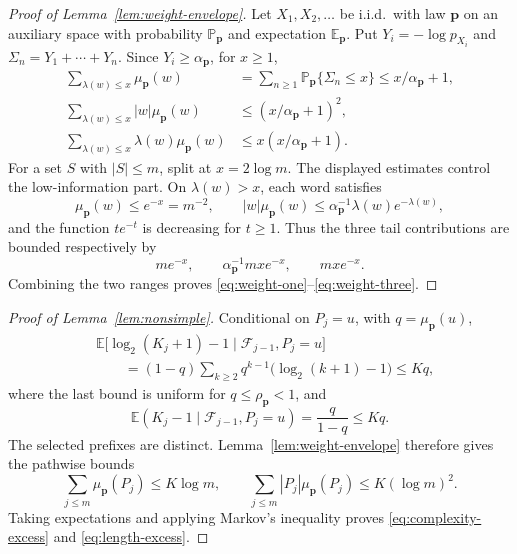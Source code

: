 \documentclass[journal]{IEEEtran}
\theoremstyle{plain}
\theoremstyle{definition}
\theoremstyle{remark}
\newcommand{\F}{\mathcal F}
\newcommand{\Paux}{\mathbb P_{\mathbf p}}
\newcommand{\Eaux}{\mathbb E_{\mathbf p}}
\newcommand{\muP}{\mu_{\mathbf p}}
\newcommand{\rhoP}{\rho_{\mathbf p}}
\newcommand{\alphaP}{\alpha_{\mathbf p}}
\begin{document}
\begin{proof}[Proof of Lemma~\ref{lem:weight-envelope}]
Let $X_1,X_2,\ldots$ be i.i.d.\ with law $\mathbf p$ on an auxiliary space with probability $\Paux$ and expectation $\Eaux$.  Put $Y_i=-\log p_{X_i}$ and $\Sigma_n=Y_1+\cdots+Y_n$.  Since $Y_i\ge\alphaP$, for $x\ge1$,
\begin{align*}
 \sum_{\lambda(w)\le x}\muP(w)
 &=\sum_{n\ge1}\Paux\{\Sigma_n\le x\}
 \le x/\alphaP+1,\\
 \sum_{\lambda(w)\le x}|w|\muP(w)
 &\le (x/\alphaP+1)^2,\\
 \sum_{\lambda(w)\le x}\lambda(w)\muP(w)
 &\le x(x/\alphaP+1).
\end{align*}
For a set $S$ with $|S|\le m$, split at $x=2\log m$.  The displayed estimates control the low-information part.  On $\lambda(w)>x$, each word satisfies
\begin{equation*}
 \muP(w)\le e^{-x}=m^{-2},
 \qquad
 |w|\muP(w)\le\alphaP^{-1}\lambda(w)e^{-\lambda(w)},
\end{equation*}
and the function $t e^{-t}$ is decreasing for $t\ge1$.  Thus the three tail contributions are bounded respectively by
\begin{equation*}
 m e^{-x},
 \qquad
 \alphaP^{-1}mxe^{-x},
 \qquad
 mxe^{-x}.
\end{equation*}
Combining the two ranges proves \eqref{eq:weight-one}--\eqref{eq:weight-three}.
\end{proof}

\begin{proof}[Proof of Lemma~\ref{lem:nonsimple}]
Conditional on $P_j=u$, with $q=\muP(u)$,
\begin{align*}
 &\mathbb E\bigl[\log_2(K_j+1)-1\mid\F_{j-1},P_j=u\bigr]\\
 &\qquad=(1-q)\sum_{k\ge2}q^{k-1}
       \bigl(\log_2(k+1)-1\bigr)
 \le Kq,
\end{align*}
where the last bound is uniform for $q\le\rhoP<1$, and
\begin{equation*}
 \mathbb E(K_j-1\mid\F_{j-1},P_j=u)=\frac q{1-q}\le Kq.
\end{equation*}
The selected prefixes are distinct.  Lemma~\ref{lem:weight-envelope} therefore gives the pathwise bounds
\begin{equation*}
 \sum_{j\le m}\muP(P_j)\le K\log m,
 \qquad
 \sum_{j\le m}|P_j|\muP(P_j)\le K(\log m)^2.
\end{equation*}
Taking expectations and applying Markov's inequality proves \eqref{eq:complexity-excess} and \eqref{eq:length-excess}.
\end{proof}
\end{document}
